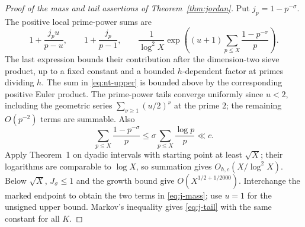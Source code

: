 \documentclass[11pt]{article}
\theoremstyle{definition}
\theoremstyle{remark}
\numberwithin{equation}{section}
\begin{document}
\begin{proof}[Proof of the mass and tail assertions of Theorem~\ref{thm:jordan}]
Put $j_p=1-p^{-\sigma}$. The positive local prime-power sums are
\begin{equation}\label{eq:a-euler-upper}
 1+\frac{j_pu}{p-u},\qquad1+\frac{j_p}{p-1},\qquad
 \frac1{\log^2X}\exp\left((u+1)\sum_{p\le X}\frac{1-p^{-\sigma}}p\right).
\end{equation}
The last expression bounds their contribution after the dimension-two sieve product, up to a fixed
constant and a bounded $h$-dependent factor at primes dividing $h$. The sum in \eqref{eq:nt-upper} is bounded above by the corresponding positive Euler product.
The prime-power tails converge uniformly since $u<2$, including the geometric series
$\sum_{\nu\ge1}(u/2)^\nu$ at the prime $2$; the remaining $O(p^{-2})$ terms are summable. Also
\begin{equation}\label{eq:a-euler-sum}
 \sum_{p\le X}\frac{1-p^{-\sigma}}p
 \le\sigma\sum_{p\le X}\frac{\log p}p\ll c.
\end{equation}
Apply Theorem~1 on dyadic intervals with starting point at least $\sqrt X$; their logarithms are
comparable to $\log X$, so summation gives $O_{h,c}(X/\log^2X)$.
Below $\sqrt X$, $J_\sigma\le1$ and the growth bound give $O(X^{1/2+1/2000})$.
Interchange the marked endpoint to obtain the two terms in \eqref{eq:j-mass}; use $u=1$ for the unsigned
upper bound. Markov's inequality gives \eqref{eq:j-tail} with the same constant for all $K$.
\end{proof}
\end{document}

